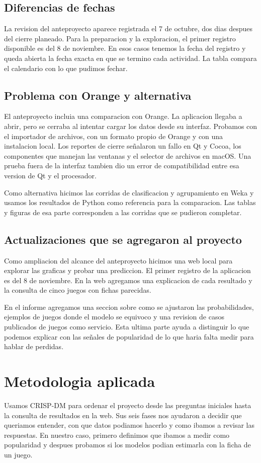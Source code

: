 \subsection{Diferencias de fechas}
La revision del anteproyecto aparece registrada el 7 de octubre, dos dias despues del cierre planeado. Para la preparacion y la exploracion, el primer registro disponible es del 8 de noviembre. En esos casos tenemos la fecha del registro y queda abierta la fecha exacta en que se termino cada actividad. La tabla compara el calendario con lo que pudimos fechar.

\PlanTrabajo

\subsection{Problema con Orange y alternativa}
El anteproyecto incluia una comparacion con Orange. La aplicacion llegaba a abrir, pero se cerraba al intentar cargar los datos desde su interfaz. Probamos con el importador de archivos, con un formato propio de Orange y con una instalacion local. Los reportes de cierre señalaron un fallo en Qt y Cocoa, los componentes que manejan las ventanas y el selector de archivos en macOS. Una prueba fuera de la interfaz tambien dio un error de compatibilidad entre esa version de Qt y el procesador.

Como alternativa hicimos las corridas de clasificacion y agrupamiento en Weka y usamos los resultados de Python como referencia para la comparacion. Las tablas y figuras de esa parte corresponden a las corridas que se pudieron completar.

\subsection{Actualizaciones que se agregaron al proyecto}
Como ampliacion del alcance del anteproyecto hicimos una web local para explorar las graficas y probar una prediccion. El primer registro de la aplicacion es del 8 de noviembre. En la web agregamos una explicacion de cada resultado y la consulta de cinco juegos con fichas parecidas.

En el informe agregamos una seccion sobre como se ajustaron las probabilidades, ejemplos de juegos donde el modelo se equivoco y una revision de casos publicados de juegos como servicio. Esta ultima parte ayuda a distinguir lo que podemos explicar con las señales de popularidad de lo que haria falta medir para hablar de perdidas.

\section{Metodologia aplicada}
\label{sec:metodologia}
Usamos CRISP-DM para ordenar el proyecto desde las preguntas iniciales hasta la consulta de resultados en la web. Sus seis fases nos ayudaron a decidir que queriamos entender, con que datos podiamos hacerlo y como ibamos a revisar las respuestas. En nuestro caso, primero definimos que ibamos a medir como popularidad y despues probamos si los modelos podian estimarla con la ficha de un juego.

